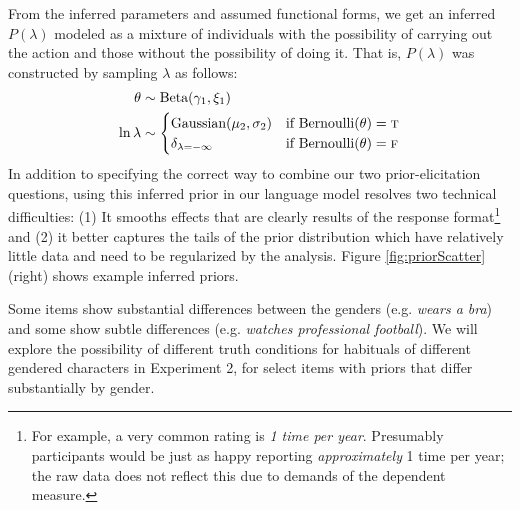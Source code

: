 \documentclass[10pt,letterpaper]{article}
\newcommand{\ndg}[1]{\textcolor{Green}{[ndg: #1]}}
\begin{document}
From the inferred parameters and assumed functional forms, we get an inferred $P(\lambda)$ modeled as a mixture of individuals with the possibility of carrying out the action and those without the possibility of doing it. 
That is, $P(\lambda)$ was constructed by sampling $\lambda$ as follows:
\begin{align}
\theta & \sim \text{Beta}(\gamma_{1}, \xi_{1}) \nonumber \\ 
\ln \lambda & \sim \begin{cases}
		\text{Gaussian}(\mu_{2}, \sigma_{2}) &\mbox{if } \text{Bernoulli}(\theta) = \textsc{t} \label{eq:priorModel}  \\
				\delta_{\lambda=-\infty} &\mbox{if } \text{Bernoulli}(\theta) = \textsc{f} \\
		\end{cases}
\end{align}
In addition to specifying the correct way to combine our two prior-elicitation questions, using this inferred prior in our language model resolves two technical difficulties: (1) It smooths effects that are clearly results of the response format\footnote{For example, a very common rating is \emph{1 time per year}. Presumably participants would be just as happy reporting \emph{approximately} 1 time per year; the raw data does not reflect this due to demands of the dependent measure.} 
and (2) it better captures the tails of the prior distribution which have relatively little data and need to be regularized by the analysis.
Figure \ref{fig:priorScatter} (right) shows example inferred priors.

Some items show substantial differences between the genders (e.g. \emph{wears a bra}) and some show subtle differences (e.g. \emph{watches professional football}). 
We will explore the possibility of different truth conditions for habituals of different gendered characters in Experiment 2, for select items with priors that differ substantially by gender.
\end{document}

